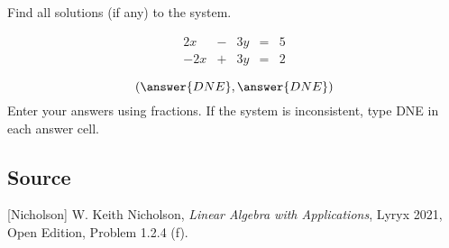 \documentclass{ximera}
\author{}
\begin{document}
\begin{exercise}
Find all solutions (if any) to the system.  

$$\begin{matrix}
      2x& -&3y&=&5\\
      -2x & +&3y&= &2
    \end{matrix}$$

 $$(\answer{DNE}, \answer{DNE})$$
Enter your answers using fractions.  If the system is inconsistent, type DNE in each answer cell.
\end{exercise}

\subsection*{Source}
[Nicholson] W. Keith Nicholson, {\it Linear Algebra with Applications}, Lyryx 2021, Open Edition, Problem 1.2.4 (f).
\end{document}
